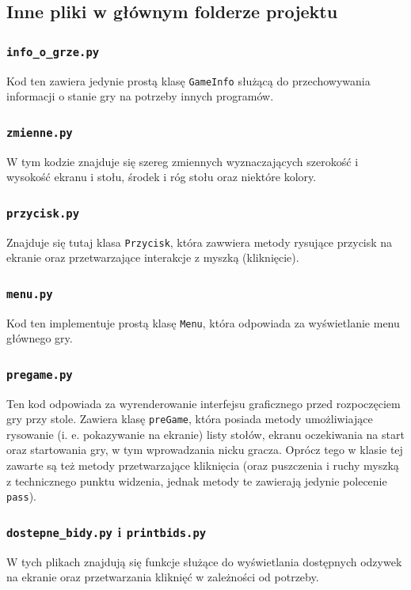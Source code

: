 \documentclass{article}
\begin{document}
\subsection{Inne pliki w głównym folderze projektu}

\subsubsection{\texttt{info\_o\_grze.py}}
Kod ten zawiera jedynie prostą klasę \texttt{GameInfo} służącą do przechowywania informacji o stanie gry na potrzeby innych programów.

\subsubsection{\texttt{zmienne.py}}
W tym kodzie znajduje się szereg zmiennych wyznaczających szerokość i wysokość ekranu i stołu, środek i róg stołu oraz niektóre kolory.

\subsubsection{\texttt{przycisk.py}}
Znajduje się tutaj klasa \texttt{Przycisk}, która zawwiera metody rysujące przycisk na ekranie oraz przetwarzające interakcje z myszką (kliknięcie).

\subsubsection{\texttt{menu.py}}
Kod ten implementuje prostą klasę \texttt{Menu}, która odpowiada za wyświetlanie menu głównego gry.

\subsubsection{\texttt{pregame.py}}
Ten kod odpowiada za wyrenderowanie interfejsu graficznego przed rozpoczęciem gry przy stole. Zawiera klasę \texttt{preGame}, która posiada metody umożliwiające rysowanie (i. e. pokazywanie na ekranie) listy stołów, ekranu oczekiwania na start oraz startowania gry, w tym wprowadzania nicku gracza. Oprócz tego w klasie tej zawarte są też metody przetwarzające kliknięcia (oraz puszczenia i ruchy myszką z technicznego punktu widzenia, jednak metody te zawierają jedynie polecenie \texttt{pass}).

\subsubsection{\texttt{dostepne\_bidy.py} i \texttt{printbids.py}}
W tych plikach znajdują się funkcje służące do wyświetlania dostępnych odzywek na ekranie oraz przetwarzania kliknięć w zależności od potrzeby.
\end{document}
